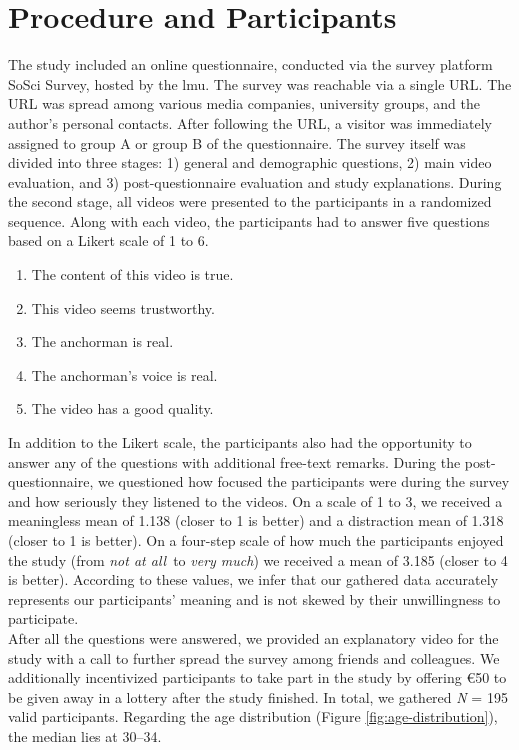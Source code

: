 \documentclass[
  a4paper,  %
  twoside,  %
  bibliography=totoc,
  headsepline,
  cleardoublepage=empty,
  parskip=half,
  draft=false
]{scrbook}
\begin{document}
\section{Procedure and Participants}
\label{sec:procedure-and-participants}

The study included an online questionnaire, conducted via the survey platform SoSci Survey, hosted by the \gls{lmu}. The survey was reachable via a single URL. The URL was spread among various media companies, university groups, and the author's personal contacts. After following the URL, a visitor was immediately assigned to group A or group B of the questionnaire. The survey itself was divided into three stages: 1) general and demographic questions, 2) main video evaluation, and 3) post-questionnaire evaluation and study explanations. During the second stage, all videos were presented to the participants in a randomized sequence. Along with each video, the participants had to answer five questions based on a Likert scale of 1 to 6.
\begin{enumerate}
  \item The content of this video is true.
  \item This video seems trustworthy.
  \item The anchorman is real.
  \item The anchorman's voice is real.
  \item The video has a good quality.
\end{enumerate}
In addition to the Likert scale, the participants also had the opportunity to answer any of the questions with additional free-text remarks. During the post-questionnaire, we questioned how focused the participants were during the survey and how seriously they listened to the videos. On a scale of 1 to 3, we received a meaningless mean of 1.138 (closer to 1 is better) and a distraction mean of 1.318 (closer to 1 is better). On a four-step scale of how much the participants enjoyed the study (from \textit{not at all} to \textit{very much}) we received a mean of 3.185 (closer to 4 is better). According to these values, we infer that our gathered data accurately represents our participants' meaning and is not skewed by their unwillingness to participate. \\
After all the questions were answered, we provided an explanatory video for the study with a call to further spread the survey among friends and colleagues. We additionally incentivized participants to take part in the study by offering €50 to be given away in a lottery after the study finished.
In total, we gathered \textit{N} = 195 valid participants. Regarding the age distribution (Figure \ref{fig:age-distribution}), the median lies at 30–34.
\end{document}
